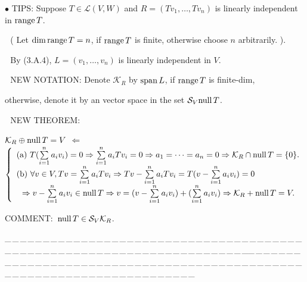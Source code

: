 \documentclass[a4paper, 11pt, UTF8]{article}
\def\range{\textup{range}\,}
\def\null{\textup{null\,}}
\def\Spn{\textup{span}\,}
\def\Lm{\mathcal{L}}
\begin{document}
\begin{large}
{\small $\bullet$} {\timesbf\Large T{\normalsize IPS:}} {\timessl\Large Suppose $T\in\Lm(V,W)$ and $R=(Tv_1,\dots,Tv_n)$ is linearly independent in $\range T$.}\par\,\,\quad\qquad
{\timessl\normalsize ( Let $\dim\range T=n$, if $\range T$ is finite, otherwise choose $n$ arbitrarily. ).}\par\,\,\quad\qquad
{\timessl\Large By (3.A.4), $L=(v_1,\dots,v_n)$ is linearly independent in $V$.}\par\,\,
{\timesbf\Large N{\normalsize EW} N{\normalsize OTATION:}} {\timessl\Large Denote $\mathcal{K}_R$ by $\Spn L$, if $\range T$ is finite-dim,}\par\qquad\quad\qquad\qquad\qquad
{\timessl\Large otherwise, denote it by an vector space in the set $\mathcal{S}_V\null T$.}\par\,\,
{\timesbf\Large N{\normalsize EW} T{\normalsize HEOREM:}}\par\quad
{\Large $\mathcal{K}_R\oplus\null T=V$} {\LARGE $\Leftarrow$} {\small $\left\{\begin{array}{l}
(\textup a)\,\,T(\sum\limits_{i=1}^n a_i v_i)=0\Rightarrow \sum\limits_{i=1}^n a_i Tv_i=0\Rightarrow a_1=\dots=a_n=0\Rightarrow\mathcal{K}_R\cap\null T=\{0\}.\\
(\textup b)\,\,\forall v\in V, Tv=\sum\limits_{i=1}^n a_i Tv_i\Rightarrow Tv-\sum\limits_{i=1}^n a_i Tv_i=T(v-\sum\limits_{i=1}^n a_i v_i)=0\\
\,\,\,\,\Rightarrow v-\sum\limits_{i=1}^n a_i v_i\in\null T\Rightarrow v=(v-\sum\limits_{i=1}^n a_i v_i)+(\sum\limits_{i=1}^n a_i v_i)\Rightarrow\mathcal{K}_R+\null T=V.\\
\end{array}\right.$}\par
{\timesbf\Large C{\normalsize OMMENT:}}\,\,\,$\null T\in\mathcal{S}_V \mathcal{K}_R$.\par
{\tiny \_\,\_\,\_\,\_\,\_\,\_\,\_\,\_\,\_\,\_\,\_\,\_\,\_\,\_\,\_\,\_\,\_\,\_\,\_\,\_\,\_\,\_\,\_\,\_\,\_\,\_\,\_\,\_\,\_\,\_\,\_\,\_\,\_\,\_\,\_\,\_\,\_\,\_\,\_\,\_\,\_\,\_\,\_\,\_\,\_\,\_\,\_\,\_\,\_\,\_\,\_\,\_\,\_\,\_\,\_\,\_\,\_\,\_\,\_\,\_\,\_\,\_\,\_\,\_\,\_\,\_\,\_\,\_\,\_\,\_\,\_\_\,\_\,\_\,\_\,\_\,\_\,\_\,\_\,\_\,\_\,\_\,\_\,\_\,\_\,\_\,\_\,\_\,\_\,\_\,\_\,\_\,\_\,\_\,\_\,\_\,\_\,\_\,\_\,\_\,\_\,\_\,\_\,\_\,\_\,\_\,\_\,\_\,\_\,\_\,\_\,\_\,\_\,\_\,\_\,\_\,\_\,\_\,\_\,\_\,\_\,\_\,\_\,\_\,\_\,\_\,\_\,\_\,\_\,\_\,\_\,\_\,\_\,\_\,\_\,\_\,\_\,\_\,\_\,\_\,\_\,\_}\par


\end{large}
\end{document}

